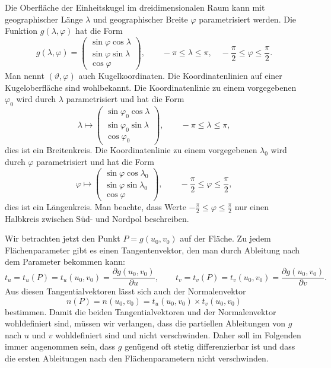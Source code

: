 \begin{beispiel}
Die Oberfläche der Einheitskugel im dreidimensionalen Raum kann mit
geographischer Länge $\lambda$ und geographischer Breite $\varphi$
parametrisiert werden.
%
%
%
%
%
Die Funktion $g(\lambda,\varphi)$ hat die Form
\begin{equation}
g(\lambda,\varphi)
=
\begin{pmatrix}
\sin\varphi\cos\lambda\\
\sin\varphi\sin\lambda\\
\cos\varphi
\end{pmatrix},\qquad
-\pi \le \lambda \le \pi,\quad
-\frac{\pi}2 \le \varphi \le \frac{\pi}2
.
\end{equation}
Man nennt $(\vartheta,\varphi)$ auch Kugelkoordinaten.
%
Die Koordinatenlinien auf einer Kugeloberfläche sind wohlbekannt. 
Die Koordinatenlinie zu einem vorgegebenen $\varphi_0$ wird durch
$\lambda$ parametrisiert und hat die Form
\[
\lambda
\mapsto
\begin{pmatrix}
\sin\varphi_0\cos\lambda\\
\sin\varphi_0\sin\lambda\\
\cos\varphi_0
\end{pmatrix},\qquad -\pi\le\lambda\le\pi,
\]
dies ist ein Breitenkreis.
%
Die Koordinatenlinie zu einem vorgegebenen $\lambda_0$ wird durch
$\varphi$ parametrisiert und hat die Form
\[
\varphi
\mapsto
\begin{pmatrix}
\sin\varphi\cos\lambda_0\\
\sin\varphi\sin\lambda_0\\
\cos\varphi
\end{pmatrix},\qquad -\frac{\pi}2 \le \varphi\le \frac{\pi}2,
\]
dies ist ein Längenkreis.
%
Man beachte, dass Werte $-\frac{\pi}2\le \varphi \le \frac{\pi}2$ nur einen
Halbkreis zwischen Süd- und Nordpol beschreiben.
\end{beispiel}

Wir betrachten jetzt den Punkt $P=g(u_0,v_0)$ auf der Fläche.
Zu jedem Flächenparameter gibt es einen Tangentenvektor, den man durch
Ableitung nach dem Parameter bekommen kann:
\begin{equation}
t_u
=
t_u(P)
=
t_u(u_0,v_0)
=
\frac{\partial g(u_0,v_0)}{\partial u},
\qquad
t_v
=
t_v(P)
=
t_v(u_0,v_0)
=
\frac{\partial g(u_0,v_0)}{\partial v}.
\end{equation}
Aus diesen Tangentialvektoren lässt sich auch der Normalenvektor
\begin{equation}
n(P) = n(u_0,v_0) = t_u(u_0,v_0) \times t_v(u_0,v_0)
\end{equation}
bestimmen.
Damit die beiden Tangentialvektoren und der Normalenvektor wohldefiniert sind,
müssen wir verlangen, dass die partiellen Ableitungen von $g$ nach $u$ und $v$
wohldefiniert sind und nicht verschwinden.
Daher soll im Folgenden immer angenommen sein, dass $g$ genügend oft stetig
differenzierbar ist und dass die ersten Ableitungen nach den Flächenparametern
nicht verschwinden.

